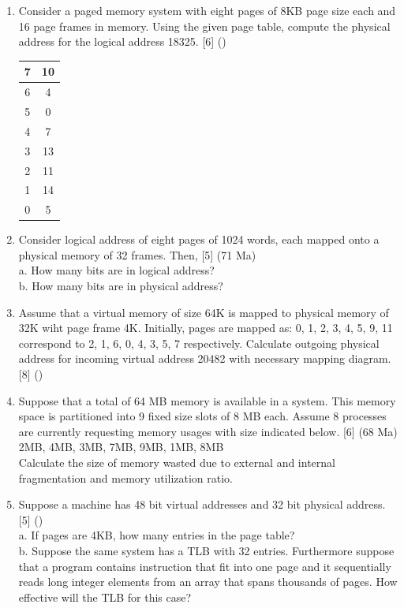 \documentclass[12pt]{article}
\begin{document}
\begin{enumerate}
			\item Consider a paged memory system with eight pages of 8KB page size each and 16 page frames in memory. Using the given page table, compute the physical address for the logical address 18325. \hfill [6] ()\\
			\begin{tabular}{|c|c|}
				\hline
				7 & 10 \\ \hline
				6 & 4 \\ \hline
				5 & 0 \\ \hline
				4 & 7 \\ \hline
				3 & 13 \\ \hline
				2 & 11 \\ \hline
				1 & 14 \\ \hline
				0 & 5 \\ \hline
			\end{tabular}

			\item Consider logical address of eight pages of 1024 words, each mapped onto a physical memory of 32 frames. Then, \hfill [5] (71 Ma)\\
			a. How many bits are in logical address?\\
			b. How many bits are in physical address?

			\item Assume that a virtual memory of size 64K is mapped to physical memory of 32K wiht page frame 4K. Initially, pages are mapped as: 0, 1, 2, 3, 4, 5, 9, 11 correspond to 2, 1, 6, 0, 4, 3, 5, 7 respectively. Calculate outgoing physical address for incoming virtual address 20482 with necessary mapping diagram. \hfill [8] ()

			\item Suppose that a total of 64 MB memory is available in a system. This memory space is partitioned into 9 fixed size slots of 8 MB each. Assume 8 processes are currently requesting memory usages with size indicated below. \hfill [6] (68 Ma)\\
			2MB, 4MB, 3MB, 7MB, 9MB, 1MB, 8MB\\
			Calculate the size of memory wasted due to external and internal fragmentation and memory utilization ratio.

			\item Suppose a machine has 48 bit virtual addresses and 32 bit physical address. \hfill [5] ()\\
			a. If pages are 4KB, how many entries in the page table?\\
			b. Suppose the same system has a TLB with 32 entries. Furthermore suppose that a program contains instruction that fit into one page and it sequentially reads long integer elements from an array that spans thousands of pages. How effective will the TLB for this case?
		\end{enumerate}
		
\end{document}
